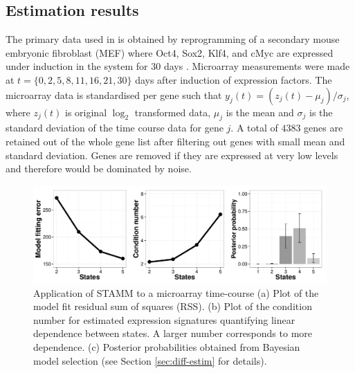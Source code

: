 \subsection{Estimation results}
\label{sec:estimation-results}

The primary data used in \cite{Armond:2013} is obtained by reprogramming of a secondary mouse embryonic fibroblast (MEF) where Oct4, Sox2, Klf4, and cMyc are expressed under induction in the system for 30 days \citep{SamavarchiTehrani:2010cp}. Microarray measurements were made at $t = \lbrace 0, 2, 5, 8, 11, 16, 21, 30 \rbrace$ days after induction of expression factors. The microarray data is standardised per gene such that $y_j(t) = \left(z_j(t) - \mu_j \right) / \sigma_j$, where $z_j(t)$ is original $\log_2$ transformed data, $\mu_j$ is the mean and $\sigma_j$ is the standard deviation of the time course data for gene $j$. A total of $4383$ genes are retained out of the whole gene list after filtering out genes with small mean and standard deviation. Genes are removed if they are expressed at very low levels and therefore would be dominated by noise.

\begin{figure}[!t]
  \centering
  \includegraphics[width=1\textwidth]{pics/rss_rcond_bay1.pdf}
  \caption{Application of STAMM to a microarray time-course (a) Plot of the model fit residual sum of squares (RSS). (b) Plot of the condition number for estimated expression signatures quantifying linear dependence between states. A larger number corresponds to more dependence. (c) Posterior probabilities obtained from Bayesian model selection (see Section \ref{sec:diff-estim} for details).}
  \label{fig:model-fit-repro}
\end{figure}


